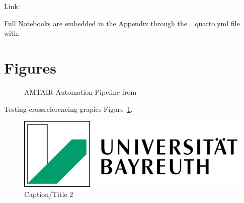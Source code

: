\documentclass[
  11pt,
  letterpaper,
]{book}
\begin{document}
Link:

Full Notebooks are embedded in the Appendix through the \_quarto.yml
file with:

\section*{Figures}\label{sec-figures1}


\begin{figure}


\caption[Five-step AMTAIR automation pipeline from PDFs to Bayesian
networks]{\label{fig-automation_pipeline}AMTAIR Automation Pipeline from
\textcite{bucknall2022}}

\end{figure}%

Testing crossreferencing grapics Figure~\ref{fig-automation_pipeline}.

\begin{figure}

\includegraphics[width=0.3\linewidth,height=\textheight,keepaspectratio]{images/cover.png}

\caption[Short 2 caption]{\label{fig-testgraphic2}Caption/Title 2}

\end{figure}%
\end{document}
